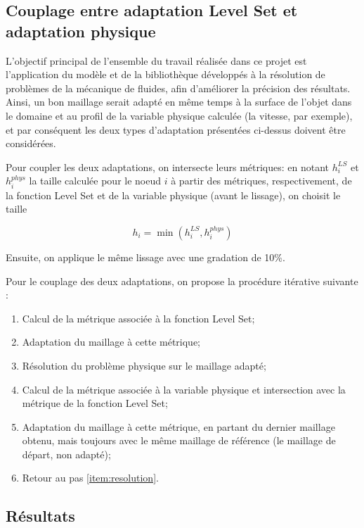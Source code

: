 \subsection{Couplage entre adaptation Level Set et adaptation physique}

\indent L'objectif principal de l'ensemble du travail réalisée dans ce projet est l'application du modèle et de la bibliothèque développés à la résolution de problèmes de la mécanique de fluides, afin d'améliorer la précision des résultats. Ainsi, un bon maillage serait adapté en même temps à la surface de l'objet dans le domaine et au profil de la variable physique calculée (la vitesse, par exemple), et par conséquent les deux types d'adaptation présentées ci-dessus doivent être considérées.

\indent Pour coupler les deux adaptations, on intersecte leurs métriques: en notant \(h_i^{LS}\) et \(h_i^{phys}\) la taille calculée pour le noeud \(i\) à partir des métriques, respectivement, de la fonction Level Set et de la variable physique (avant le lissage), on choisit le taille

\begin{equation*}
	h_i = \min(h_i^{LS},h_i^{phys})
\end{equation*}

\indent Ensuite, on applique le même lissage avec une gradation de 10\%.

\indent Pour le couplage des deux adaptations, on propose la procédure itérative suivante :  

\begin{enumerate}
	\item Calcul de la métrique associée à la fonction Level Set;
	\item Adaptation du maillage à cette métrique;
	\item \label{item:resolution} Résolution du problème physique sur le maillage adapté;
	\item Calcul de la métrique associée à la variable physique et intersection avec la métrique de la fonction Level Set;
	\item Adaptation du maillage à cette métrique, en partant du dernier maillage obtenu, mais toujours avec le même maillage de référence (le maillage de départ, non adapté);
	\item Retour au pas \ref{item:resolution}.
\end{enumerate}

\subsection{Résultats}

